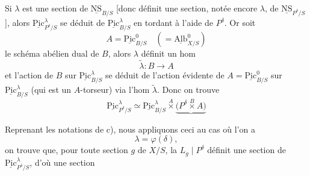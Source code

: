 \documentclass[11pt,a4paper]{article}
\begin{document}

Si $\lambda$ est une section de $\underline{\mathrm{NS}}_{B/S}$ [donc définit
une section, notée encore $\lambda$, de
$\underline{\mathrm{NS}}_{P^{\delta}/S}$], alors
$\underline{\mathrm{Pic}}^{\lambda}_{P^{\delta}/S}$ se déduit de
$\underline{\mathrm{Pic}}^{\lambda}_{B/S}$ en tordant à l'aide de
$P^{\delta}$. Or soit
\[
A = \underline{\mathrm{Pic}}^{0}_{B/S} \quad (= \underline{\mathrm{Alb}}^{0}_{X/S})
\]
le schéma abélien dual de $B$, \struck{\ill{}} alors $\lambda$ définit un hom
\[
\tilde{\lambda} : B \longrightarrow A
\]
et l'action de $B$ sur $\underline{\mathrm{Pic}}^{\lambda}_{B/S}$ se déduit de
l'action évidente de $A = \underline{\mathrm{Pic}}^{0}_{B/S}$ sur
$\underline{\mathrm{Pic}}^{\lambda}_{B/S}$ (qui est un $A$-torseur) via l'hom
$\tilde{\lambda}$. Donc on trouve
\[
\underline{\mathrm{Pic}}^{\lambda}_{P^{\delta}/S} \simeq
\underline{\mathrm{Pic}}^{\lambda}_{B/S} \overset{A}{\times}
\underbrace{\bigl(P^{\delta} \overset{B}{\times} A\bigr)}
\]

\struck{\ill{}} Reprenant les notations de c), nous appliquons ceci au cas où
l'on a
\[ \lambda = \varphi(\delta) , \]
on trouve que, pour toute \struck{\ill{}} section $g$ de $X/S$, la
 $L_g \mid P^{\delta}$ définit une section de
$\underline{\mathrm{Pic}}^{\lambda}_{P^{\delta}/S}$, d'où une section

\end{document}
